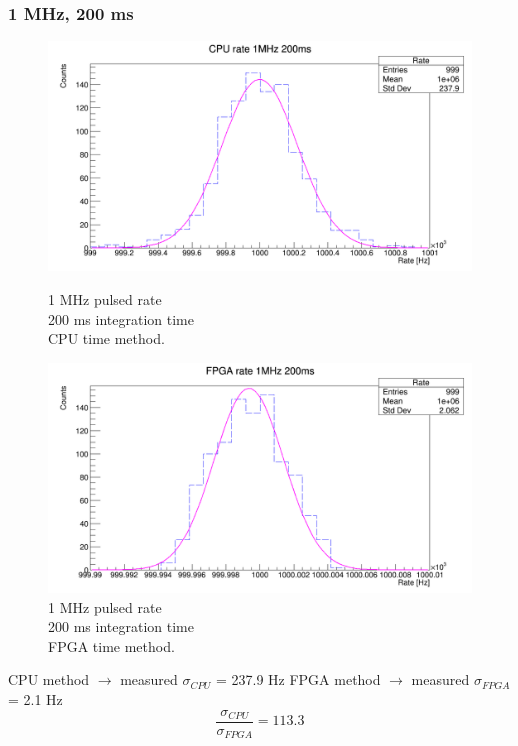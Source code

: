 \subsubsection{1 MHz, 200 ms}
\begin{figure}[H]
	\centering
	\begin{minipage}{0.49\textwidth}
		\centering
		\includegraphics[width=.99\linewidth]{IMG/ch5/RateMeasures/CPU-time-rate-1MHz-200ms}
		\caption{1 MHz pulsed rate\\200 ms integration time\\CPU time method.}
		\label{fig:CPU-time-rate-1MHz-200ms}
	\end{minipage}%
	\begin{minipage}{0.49\textwidth}
		\centering
		\includegraphics[width=.99\linewidth]{IMG/ch5/RateMeasures/FPGA-time-rate-1MHz-200ms}
		\caption{1 MHz pulsed rate\\200 ms integration time\\FPGA time method.}
		\label{fig:FPGA-time-rate-1MHz-200ms}
	\end{minipage}
\end{figure}
\noindent CPU method $\rightarrow$ measured $\sigma_{CPU}$ = 237.9 Hz
\newline
FPGA method $\rightarrow$ measured $\sigma_{FPGA}$ = 2.1 Hz
\begin{equation}
	\frac{\sigma_{CPU}}{\sigma_{FPGA}} = 113.3
\end{equation}

